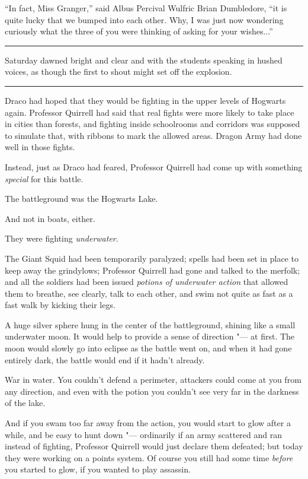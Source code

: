``In fact, Miss Granger,'' said Albus Percival Wulfric Brian Dumbledore,
``it is quite lucky that we bumped into each other. Why, I was just now
wondering curiously what the three of you were thinking of asking for
your wishes...''

\begin{center}\rule{3in}{0.4pt}\end{center}

Saturday dawned bright and clear and with the students speaking in
hushed voices, as though the first to shout might set off the explosion.

\begin{center}\rule{3in}{0.4pt}\end{center}

Draco had hoped that they would be fighting in the upper levels of
Hogwarts again. Professor Quirrell had said that real fights were more
likely to take place in cities than forests, and fighting inside
schoolrooms and corridors was supposed to simulate that, with ribbons to
mark the allowed areas. Dragon Army had done well in those fights.

Instead, just as Draco had feared, Professor Quirrell had come up with
something \emph{special} for this battle.

The battleground was the Hogwarts Lake.

And not in boats, either.

They were fighting \emph{underwater}.

The Giant Squid had been temporarily paralyzed; spells had been set in
place to keep away the grindylows; Professor Quirrell had gone and
talked to the merfolk; and all the soldiers had been issued
\emph{potions of underwater action} that allowed them to breathe, see
clearly, talk to each other, and swim not quite as fast as a fast walk
by kicking their legs.

A huge silver sphere hung in the center of the battleground, shining
like a small underwater moon. It would help to provide a sense of
direction "--- at first. The moon would slowly go into eclipse as the
battle went on, and when it had gone entirely dark, the battle would end
if it hadn't already.

War in water. You couldn't defend a perimeter, attackers could come at
you from any direction, and even with the potion you couldn't see very
far in the darkness of the lake.

And if you swam too far away from the action, you would start to glow
after a while, and be easy to hunt down "--- ordinarily if an army
scattered and ran instead of fighting, Professor Quirrell would just
declare them defeated; but today they were working on a points system.
Of course you still had some time \emph{before} you started to glow, if
you wanted to play assassin.

